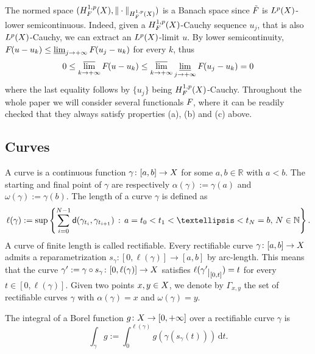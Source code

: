 \documentclass[12pt]{amsart}
\newcommand{\sfd}{{\sf d}}
\renewcommand{\d}{{\mathrm d}}
\newcommand{\restr}[1]{\lower3pt\hbox{$|_{#1}$}}
\newcommand{\limi}{\varliminf}
\newcommand{\lims}{\varlimsup}
\newcommand{\X}{{\rm X}}
\newcommand{\F}{{\rm F}}
\theoremstyle{definition}
\newcommand{\HH}[2]{H^{1,#1}_{{\rm #2}}}
\renewcommand{\F}[1]{{\rm F}_{{\rm #1}}}
\newcommand{\relF}[1]{\tilde{\rm F}_{{\rm #1}}}
\begin{document}
The normed space $(\HH{p}{F}(\X), \Vert \cdot \Vert_{\HH{p}{F}(\X)})$ is a Banach space since $\relF{}$ is $L^p(\X)$-lower semicontinuous.
Indeed, given a $\HH{p}{F}(\X)$-Cauchy sequence $u_j$, that is also $L^p(\X)$-Cauchy, we can extract an $L^p(\X)$-limit $u$. By lower semicontinuity, $\F{}(u-u_k)\le \limi_{j\to +\infty} \F{}(u_j-u_k)$ for every $k$, thus
\begin{equation*}
    0 \le \lims_{k\to +\infty} \F{}(u-u_k)\le \lims_{k\to +\infty}\limi_{j\to +\infty} \F{}(u_j-u_k)=0
\end{equation*}
where the last equality follows by $\{u_j\}$ being $\HH{p}{F}(\X)$-Cauchy. Throughout the whole paper we will consider several functionals $\F{}$, where it can be readily checked that they always satisfy properties (a), (b) and (c) above.


\subsection{Curves}
A curve is a continuous function $\gamma \colon [a,b] \to \X$ for some $a,b \in \mathbb{R}$ with $a<b$. The starting and final point of $\gamma$ are respectively $\alpha(\gamma):=\gamma(a)$ and $\omega(\gamma) := \gamma(b)$.
The length of a curve $\gamma$ is defined as
\begin{equation}
    \label{eq:defin_length_curve}
    \ell(\gamma):=\sup \left\{ \sum_{i=0}^{N-1} \sfd(\gamma_{t_i},\gamma_{t_{i+1}})\,:\,a=t_0 < t_1 < \dots < t_N=b,\, N \in \mathbb{N}
    \right\}.
\end{equation}
A curve of finite length is called rectifiable. Every rectifiable curve $\gamma \colon [a,b] \to \X$ admits a reparametrization $s_\gamma \colon [0,\ell(\gamma)] \to [a,b]$ by arc-length. This means that the curve $\gamma' := \gamma \circ s_\gamma \colon [0,\ell(\gamma)] \to \X$ satisfies $\ell(\gamma'\restr{[0,t]}) = t$ for every $t\in [0,\ell(\gamma)]$. 
Given two points $x,y\in \X$, we denote by $\Gamma_{x,y}$ the set of rectifiable curves $\gamma$ with $\alpha(\gamma)=x$ and $\omega(\gamma)=y$.

The integral of a Borel function $g\colon \X \to [0,+\infty]$ over a rectifiable curve $\gamma$ is
\begin{equation}
    \label{eq:defin_integral_over_curve}
    \int_\gamma g := \int_0^{\ell(\gamma)} g(\gamma(s_\gamma(t)))\,\d t.
\end{equation}
\end{document}
